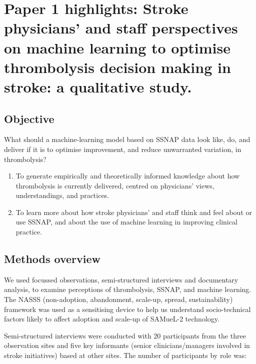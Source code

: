 \section{Paper 1 highlights: Stroke physicians' and staff perspectives on machine learning to optimise thrombolysis decision making in stroke: a qualitative study. \cite{jarvie_stroke_2024}}\label{sec:paper_1}

\subsection{Objective}

What should a machine-learning model based on SSNAP data look like, do, and deliver if it is to optimise improvement, and reduce unwarranted variation, in thrombolysis?

\begin{enumerate}
    \item To generate empirically and theoretically informed knowledge about how thrombolysis is currently delivered, centred on physicians’ views, understandings, and practices.
    \item To learn more about how stroke physicians’ and staff think and feel about or use SSNAP, and about the use of machine learning in improving clinical practice.
\end{enumerate}

\subsection{Methods overview}

We used focussed observations, semi-structured interviews and documentary analysis, to examine perceptions of thrombolysis, SSNAP, and machine learning. The NASSS (non-adoption, abandonment, scale-up, spread, sustainability) framework \cite{greenhalgh_beyond_2017} was used as a sensitising device to help us understand socio-technical factors likely to affect adoption and scale-up of SAMueL-2 technology.

Semi-structured interviews were conducted with 20 participants from the three observation sites and five key informants (senior clinicians/managers involved in stroke initiatives) based at other sites. The number of participants by role was:

